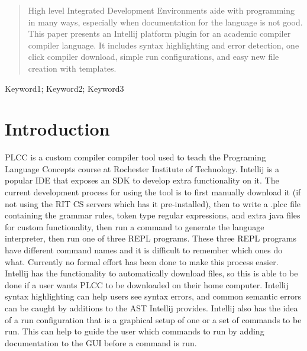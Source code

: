 \documentclass[conference, letterpaper]{IEEEtran}
\begin{document}
\begin{abstract}
    High level Integrated Development Environments aide with programming in many ways, especially when documentation for the language is not good.
    This paper presents an Intellij platform plugin for an academic compiler compiler language.
    It includes syntax highlighting and error detection, one click compiler download, simple run configurations, and easy new file creation with templates.
\end{abstract}



\begin{IEEEkeywords}
Keyword1; Keyword2; Keyword3
\end{IEEEkeywords}


%
\IEEEpeerreviewmaketitle



\section{Introduction}\label{sec:introduction}
PLCC\cite{plcc-paper} is a custom compiler compiler tool used to teach the Programing Language Concepts course at Rochester Institute of Technology.
    Intellij is a popular IDE that exposes an SDK to develop extra functionality on it.
    The current development process for using the tool is to first manually download it (if not using the RIT CS servers which has it pre-installed), then to write a .plcc file containing the grammar rules, token type regular expressions, and extra java files for custom functionality, then run a command to generate the language interpreter, then run one of three REPL programs.
    These three REPL programs have different command names and it is difficult to remember which ones do what.
    Currently no formal effort has been done to make this process easier.
    Intellij has the functionality to automatically download files, so this is able to be done if a user wants PLCC to be downloaded on their home computer.
    Intellij syntax highlighting can help users see syntax errors, and common semantic errors can be caught by additions to the AST Intellij provides.
    Intellij also has the idea of a run configuration that is a graphical setup of one or a set of commands to be run.
    This can help to guide the user which commands to run by adding documentation to the GUI before a command is run.
\end{document}
